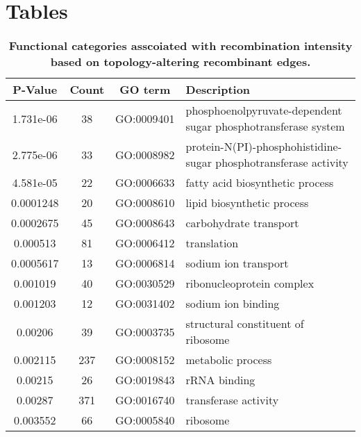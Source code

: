 \documentclass[10pt]{article}
\providecommand{\tabularnewline}{\\}
\begin{document}
\section*{Tables}

\begin{table}
\caption{\label{tab:functional}
\bf{Functional categories asscoiated with 
recombination intensity based on topology-altering recombinant edges.}}
\noindent \begin{centering}
\begin{tabular}{cccl}
\hline 
P-Value & Count & GO term & Description\tabularnewline
\hline 
1.731e-06 & 38 & GO:0009401 & phosphoenolpyruvate-dependent sugar phosphotransferase system\tabularnewline
2.775e-06 & 33 & GO:0008982 & protein-N(PI)-phosphohistidine-sugar phosphotransferase activity\tabularnewline
4.581e-05 & 22 & GO:0006633 & fatty acid biosynthetic process\tabularnewline
0.0001248 & 20 & GO:0008610 & lipid biosynthetic process\tabularnewline
0.0002675 & 45 & GO:0008643 & carbohydrate transport\tabularnewline
0.000513 & 81 & GO:0006412 & translation\tabularnewline
0.0005617 & 13 & GO:0006814 & sodium ion transport\tabularnewline
0.001019 & 40 & GO:0030529 & ribonucleoprotein complex\tabularnewline
0.001203 & 12 & GO:0031402 & sodium ion binding\tabularnewline
0.00206 & 39 & GO:0003735 & structural constituent of ribosome\tabularnewline
0.002115 & 237 & GO:0008152 & metabolic process\tabularnewline
0.00215 & 26 & GO:0019843 & rRNA binding\tabularnewline
0.00287 & 371 & GO:0016740 & transferase activity\tabularnewline
0.003552 & 66 & GO:0005840 & ribosome\tabularnewline
\hline 
\end{tabular}
\par\end{centering}
\end{table}
\end{document}

